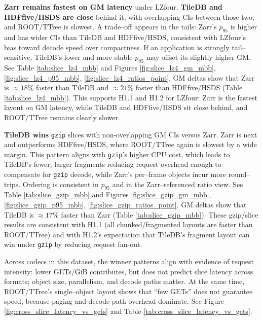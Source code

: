 \documentclass[nomenclature, english, bibtex]{kththesis}
\numberwithin{listing}{chapter}
\begin{document}
\textbf{Zarr remains fastest on \gls{GM} latency} under \gls{LZfour}. \textbf{TileDB and \gls{HDFfive}/\gls{HSDS} are close} behind it, with overlapping \glspl{CI} between those two, and \gls{ROOT}/\gls{TTree} is slowest. A trade–off appears in the tails: Zarr’s $p_{95}$ is higher and has wider CIs than TileDB and \gls{HDFfive}/\gls{HSDS}, consistent with \gls{LZfour}’s bias toward decode speed over compactness. If an application is strongly tail–sensitive, TileDB’s lower and more stable $p_{95}$ may offset its slightly higher \gls{GM}. See Table \ref{tab:slice_lz4_mbb} and Figures \ref{fig:slice_lz4_gm_mbb}, \ref{fig:slice_lz4_p95_mbb}, \ref{fig:slice_lz4_ratios_point}. \gls{GM} deltas show that Zarr is $\approx 18\%$ faster than TileDB and $\approx 21\%$ faster than \gls{HDFfive}/\gls{HSDS} (Table \ref{tab:slice_lz4_mbb}). This supports H1.1 and H1.2 for \gls{LZfour}: Zarr is the fastest layout on \gls{GM} latency, while TileDB and \gls{HDFfive}/\gls{HSDS} sit close behind, and \gls{ROOT}/\gls{TTree} remains clearly slower.

\textbf{TileDB wins} \texttt{gzip} slices with non-overlapping \gls{GM} \glspl{CI} versus Zarr. Zarr is next and outperforms \gls{HDFfive}/\gls{HSDS}, where \gls{ROOT}/\gls{TTree} again is slowest by a wide margin. This pattern aligns with \texttt{gzip}’s higher \gls{CPU} cost, which leads to TileDB’s fewer, larger fragments reducing request overhead enough to compensate for \texttt{gzip} decode, while Zarr’s per–frame objects incur more round–trips. Ordering is consistent in $p_{95}$ and in the Zarr–referenced ratio view. See Table \ref{tab:slice_gzip_mbb} and Figures \ref{fig:slice_gzip_gm_mbb}, \ref{fig:slice_gzip_p95_mbb}, \ref{fig:slice_gzip_ratios_point}. \gls{GM} deltas show that TileDB is $\approx 17\%$ faster than Zarr (Table \ref{tab:slice_gzip_mbb}). These gzip/slice results are consistent with H1.1 (all chunked/fragmented layouts are faster than \gls{ROOT}/\gls{TTree}) and with H1.2’s expectation that TileDB’s fragment layout can win under \texttt{gzip} by reducing request fan-out.

Across codecs in this dataset, the winner patterns align with evidence of request intensity: lower GETs/GiB contributes, but does not predict slice latency across formats; object size, parallelism, and decode paths matter. At the same time, \gls{ROOT}/\gls{TTree}’s single–object layout shows that “few GETs” does not guarantee speed, because paging and decode path overhead dominate. See Figure \ref{fig:cross_slice_latency_vs_gets} and Table \ref{tab:cross_slice_latency_vs_gets}.
\end{document}

